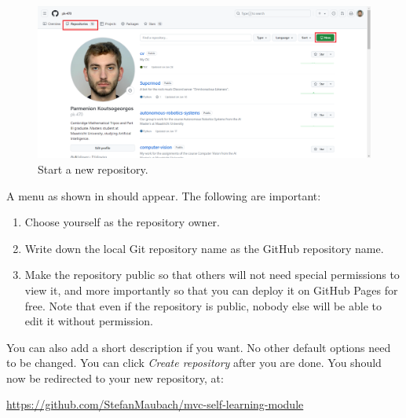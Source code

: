 \documentclass[a4paper,10pt]{article}
\begin{document}
\begin{figure}[htbp]
    \centering
    \includegraphics[width=\textwidth]{new_repository.png}
    \caption{Start a new repository.}
    \label{fig:new_repository}   
\end{figure}

A menu as shown in  should appear. The following are important:
\begin{enumerate}
    \item Choose yourself as the repository owner.
    \item Write down the local Git repository name as the GitHub repository name.
    \item Make the repository public so that others will not need special permissions to view it, and more importantly so that you can deploy it on GitHub Pages for free. Note that even if the repository is public, nobody else will be able to edit it without permission.
\end{enumerate}
You can also add a short description if you want. No other default options need to be changed. You can click \emph{Create repository} after you are done. You should now be redirected to your new repository, at:

\url{https://github.com/StefanMaubach/mvc-self-learning-module}
\end{document}
